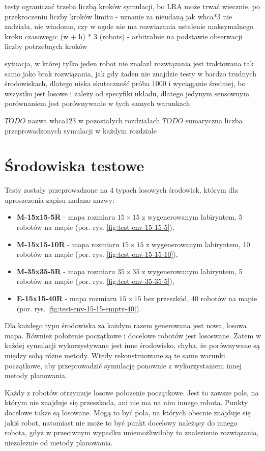 testy ograniczać trzeba liczbą kroków symulacji, bo LRA może trwać wiecznie, po przekroczeniu liczby kroków limitu - uznanie za nieudaną
jak whca*3 nie zadziała, nie wiadomo, czy w ogole nie ma rozwiazania
ustalenie maksymalnego kroku czasowego: (w + h) * 3 (robots) - arbitralnie na podstawie obserwacji liczby potrzebnych kroków

sytuacja, w której tylko jeden robot nie znalazł rozwiązania jest traktowana tak samo jako brak rozwiązania, jak gdy żaden nie znajdzie
testy w bardzo trudnych środowiskach, dlatego niska skuteczność
próba 1000 i wyciąganie średniej, bo wszystko jest losowe i zależy od specyfiki układu, dlatego jedynym sensownym porównaniem jest porównywanie w tych samych warunkach

$TODO$ nazwa whca123 w pozostałych rozdziałach
$TODO$ sumaryczna liczba przeprowadzonych symulacji w każdym rozdziale


\section{Środowiska testowe}
Testy zostały przeprowadzone na 4 typach losowych środowisk, którym dla uproszczenia zapisu nadano nazwy:
\begin{itemize}
	\item {\bf M-15x15-5R} - mapa rozmiaru $15 \times 15$ z wygenerowanym labiryntem, 5 robotów na mapie (por. rys. \ref{fig:test-env-15-15-5}),
	\item {\bf M-15x15-10R} - mapa rozmiaru $15 \times 15$ z wygenerowanym labiryntem, 10 robotów na mapie (por. rys. \ref{fig:test-env-15-15-10}),
	\item {\bf M-35x35-5R} - mapa rozmiaru $35 \times 35$ z wygenerowanym labiryntem, 5 robotów na mapie (por. rys. \ref{fig:test-env-35-35-5}),
	\item {\bf E-15x15-40R} - mapa rozmiaru $15 \times 15$ bez przeszkód, 40 robotów na mapie (por. rys. \ref{fig:test-env-15-15-empty-40}).
\end{itemize}
Dla każdego typu środowiska za każdym razem generowana jest nowa, losowa mapa. Również położenie początkowe i docelowe robotów jest lososwane. Zatem w każdej symulacji wykorzystywane jest inne środowisko, chyba, że porównywane są między sobą różne metody. Wtedy rekonstruowane są te same warunki początkowe, aby przeprowadzić symulację ponownie z wykorzystaniem innej metody planowania.

Każdy z robotów otrzymuje losowe położenie początkowe. Jest to zawsze pole, na którym nie znajduje się przeszkoda, ani nie ma na nim innego robota.
Punkty docelowe także są losowane. Mogą to być pola, na których obecnie znajduje się jakiś robot, natomiast nie może to być punkt docelowy należący do innego robota, gdyż w przeciwnym wypadku uniemożliwiłoby to znalezienie rozwiązania, niezależnie od metody planowania.


